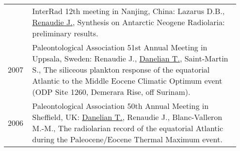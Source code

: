 \documentclass[11pt, a4paper]{article}
\begin{document}
\begin{longtable}{@{}p{0.1\linewidth} P{0.85\linewidth}@{}}
 & InterRad 12th meeting in Nanjing, China: Lazarus D.B., \underline{Renaudie J.}, Synthesis on Antarctic Neogene Radiolaria: preliminary results.\\
2007 & Paleontological Association 51st Annual Meeting in Uppsala, Sweden: Renaudie J., \underline{Danelian T.}, Saint-Martin S., The siliceous plankton response of the equatorial Atlantic to the Middle Eocene Climatic Optimum event (ODP Site 1260, Demerara Rise, off Surinam).\\
2006 & Paleontological Association 50th Annual Meeting in Sheffield, UK: \underline{Danelian T.}, Renaudie J., Blanc-Valleron M.-M., The radiolarian record of the equatorial Atlantic during the Paleocene/Eocene Thermal Maximum event.\\
\end{longtable}
\end{document}
